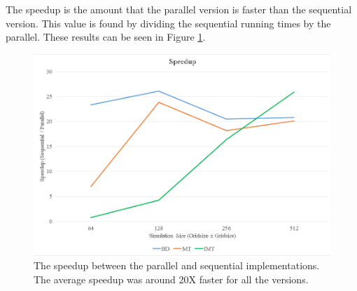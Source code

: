The speedup is the amount that the parallel version is faster than the sequential version. This value is found by dividing the sequential running times by the parallel. These results can be seen in Figure \ref{fig:speedup}. 
\begin{figure}[H]
\centering
  \includegraphics[width=\textwidth]{figures/results/speedup.png}
  \caption{The speedup between the parallel and sequential implementations. The average speedup was around 20X faster for all the versions.}
  \label{fig:speedup}
\end{figure} 

